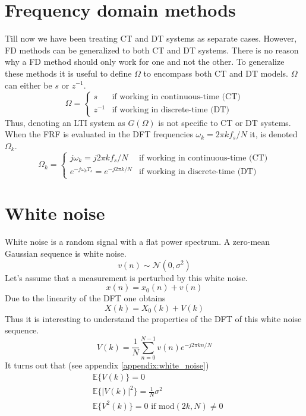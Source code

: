 \section{Frequency domain methods}
Till now we have been treating CT and DT systems as separate cases. However, FD methods can be generalized to both CT and DT systems. There is no reason why a FD method should only work for one and not the other. To generalize these methods it is useful to define $\Omega$ to encompass both CT and DT models. $\Omega$ can either be $s$ or $z^{-1}$.
\begin{equation*}
    \Omega = \begin{cases}
        s & \text{if working in continuous-time (CT)} \\
        z^{-1} & \text{if working in discrete-time (DT)} 
    \end{cases}
\end{equation*}
Thus, denoting an LTI system as $G(\Omega)$ is not specific to CT or DT systems. When the FRF is evaluated in the DFT frequencies $\omega_k = 2 \pi k f_s/N$ it, is denoted $\Omega_k$.
\begin{equation*}
    \Omega_k = \begin{cases}
        j \omega_k = j 2 \pi k f_s/N& \text{if working in continuous-time (CT)} \\
        e^{-j \omega_k T_s} = e^{-j 2 \pi k/N} & \text{if working in discrete-time (DT)} 
    \end{cases}
\end{equation*}

\section{White noise}
\label{sec:white_noise}
White noise is a random signal with a flat power spectrum. A zero-mean Gaussian sequence is white noise.
\begin{equation*}
    v(n) \sim \mathcal{N}(0,\sigma^2)
\end{equation*}
Let's assume that a measurement is perturbed by this white noise.
\begin{equation*}
    x(n) = x_0(n) + v(n)
\end{equation*}
Due to the linearity of the DFT one obtains
\begin{equation*}
    X(k) = X_0(k) + V(k)
\end{equation*}
Thus it is interesting to understand the properties of the DFT of this white noise sequence.
\begin{equation*}
    V(k) = \frac{1}{N}\sum_{n=0}^{N-1} v(n) e^{-j 2\pi k n/N}
\end{equation*}
It turns out that (see appendix \ref{appendix:white_noise})
\begin{align*}
    &\mathbb{E}\{V(k)\} = 0\\
    &\mathbb{E}\{|V(k)|^2\} = \frac{1}{N} \sigma^2 \\
    &\mathbb{E}\{V^2(k)\} = 0 \text{ if mod}(2k,N) \neq 0
\end{align*}


